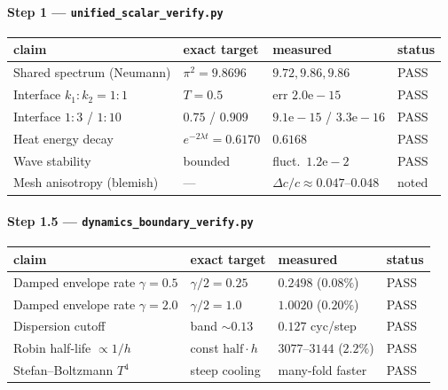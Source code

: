 \documentclass[11pt]{article}
\newcommand{\code}[1]{\texttt{#1}}
\begin{document}
\paragraph{Step 1 --- \code{unified\_scalar\_verify.py}}
\begin{longtable}{@{}p{5.6cm}p{3.2cm}p{3.4cm}l@{}}
\toprule
claim & exact target & measured & status \\ \midrule \endhead
Shared spectrum (Neumann) & $\pi^2 = 9.8696$ & $9.72, 9.86, 9.86$ & PASS \\
Interface $k_1{:}k_2 = 1{:}1$ & $T = 0.5$ & err $2.0\mathrm{e}{-}15$ & PASS \\
Interface $1{:}3$ / $1{:}10$ & $0.75$ / $0.909$ & $9.1\mathrm{e}{-}15$ / $3.3\mathrm{e}{-}16$ & PASS \\
Heat energy decay & $e^{-2\lambda t}=0.6170$ & $0.6168$ & PASS \\
Wave stability & bounded & fluct.\ $1.2\mathrm{e}{-}2$ & PASS \\
Mesh anisotropy (blemish) & --- & $\Delta c/c \approx 0.047$--$0.048$ & noted \\
\bottomrule
\end{longtable}

\paragraph{Step 1.5 --- \code{dynamics\_boundary\_verify.py}}
\begin{longtable}{@{}p{5.6cm}p{3.2cm}p{3.4cm}l@{}}
\toprule
claim & exact target & measured & status \\ \midrule \endhead
Damped envelope rate $\gamma{=}0.5$ & $\gamma/2{=}0.25$ & $0.2498$ ($0.08\%$) & PASS \\
Damped envelope rate $\gamma{=}2.0$ & $\gamma/2{=}1.0$ & $1.0020$ ($0.20\%$) & PASS \\
Dispersion cutoff & band $\sim0.13$ & $0.127$ cyc/step & PASS \\
Robin half-life $\propto 1/h$ & const $\text{half}\cdot h$ & $3077$--$3144$ ($2.2\%$) & PASS \\
Stefan--Boltzmann $T^4$ & steep cooling & many-fold faster & PASS \\
\bottomrule
\end{longtable}
\end{document}
